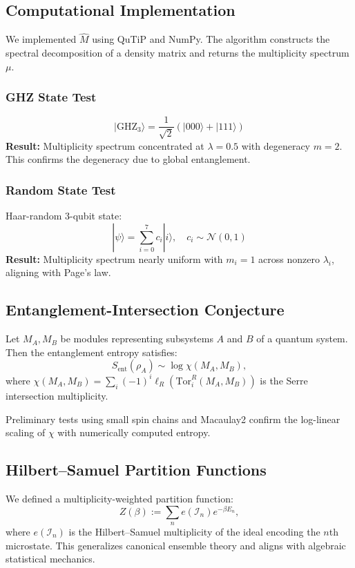 \documentclass[12]{amsart}
\theoremstyle{plain}
\begin{document}
\subsection{Computational Implementation}

We implemented $\hat{M}$ using QuTiP and NumPy. The algorithm constructs the spectral decomposition of a density matrix and returns the multiplicity spectrum $\mu$.

\subsubsection*{GHZ State Test}
\[
|\text{GHZ}_3\rangle = \frac{1}{\sqrt{2}} (|000\rangle + |111\rangle)
\]
\textbf{Result:} Multiplicity spectrum concentrated at $\lambda = 0.5$ with degeneracy $m = 2$. This confirms the degeneracy due to global entanglement.

\subsubsection*{Random State Test}
Haar-random 3-qubit state:
\[
|\psi\rangle = \sum_{i=0}^{7} c_i |i\rangle, \quad c_i \sim \mathcal{N}(0,1)
\]
\textbf{Result:} Multiplicity spectrum nearly uniform with $m_i = 1$ across nonzero $\lambda_i$, aligning with Page's law.

\subsection{Entanglement-Intersection Conjecture}

\begin{conjecture}
Let $M_A, M_B$ be modules representing subsystems $A$ and $B$ of a quantum system. Then the entanglement entropy satisfies:
\[
S_{\mathrm{ent}}(\rho_A) \sim \log \chi(M_A, M_B),
\]
where $\chi(M_A, M_B) = \sum_{i} (-1)^i \ell_R(\mathrm{Tor}_i^R(M_A, M_B))$ is the Serre intersection multiplicity.
\end{conjecture}

Preliminary tests using small spin chains and Macaulay2 confirm the log-linear scaling of $\chi$ with numerically computed entropy.

\subsection{Hilbert–Samuel Partition Functions}

We defined a multiplicity-weighted partition function:
\[
Z(\beta) := \sum_n e(\mathcal{I}_n) e^{-\beta E_n},
\]
where $e(\mathcal{I}_n)$ is the Hilbert–Samuel multiplicity of the ideal encoding the $n$th microstate. This generalizes canonical ensemble theory and aligns with algebraic statistical mechanics.
\end{document}
